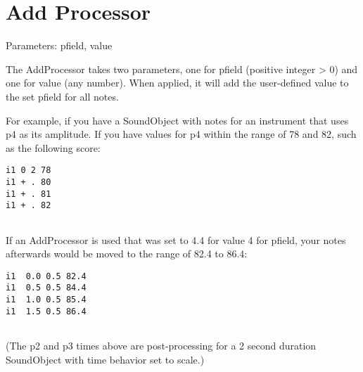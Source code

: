 \section{Add Processor}\label{addProcessor}

Parameters: pfield, value

The AddProcessor takes two parameters, one for pfield (positive integer
\textgreater{} 0) and one for value (any number). When applied, it will
add the user-defined value to the set pfield for all notes.

For example, if you have a SoundObject with notes for an instrument that
uses p4 as its amplitude. If you have values for p4 within the range of
78 and 82, such as the following score:

\begin{verbatim}
i1 0 2 78
i1 + . 80
i1 + . 81
i1 + . 82
  
\end{verbatim}

If an AddProcessor is used that was set to 4.4 for value 4 for pfield,
your notes afterwards would be moved to the range of 82.4 to 86.4:

\begin{verbatim}
i1  0.0 0.5 82.4
i1  0.5 0.5 84.4
i1  1.0 0.5 85.4
i1  1.5 0.5 86.4
  
\end{verbatim}

(The p2 and p3 times above are post-processing for a 2 second duration
SoundObject with time behavior set to scale.)
